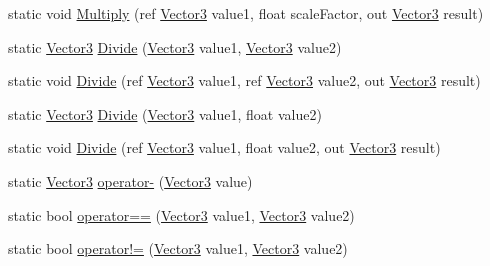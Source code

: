 \begin{DoxyCompactItemize}
\item 
static void \hyperlink{struct_microsoft_1_1_xna_1_1_framework_1_1_vector3_a5cb2ccf131794a63435195fb5d35fe67}{Multiply} (ref \hyperlink{struct_microsoft_1_1_xna_1_1_framework_1_1_vector3}{Vector3} value1, float scale\+Factor, out \hyperlink{struct_microsoft_1_1_xna_1_1_framework_1_1_vector3}{Vector3} result)
\item 
static \hyperlink{struct_microsoft_1_1_xna_1_1_framework_1_1_vector3}{Vector3} \hyperlink{struct_microsoft_1_1_xna_1_1_framework_1_1_vector3_aabf99746838a9b273d7f9c938a003469}{Divide} (\hyperlink{struct_microsoft_1_1_xna_1_1_framework_1_1_vector3}{Vector3} value1, \hyperlink{struct_microsoft_1_1_xna_1_1_framework_1_1_vector3}{Vector3} value2)
\item 
static void \hyperlink{struct_microsoft_1_1_xna_1_1_framework_1_1_vector3_a0645910ea99edbd29f4e95ff46437810}{Divide} (ref \hyperlink{struct_microsoft_1_1_xna_1_1_framework_1_1_vector3}{Vector3} value1, ref \hyperlink{struct_microsoft_1_1_xna_1_1_framework_1_1_vector3}{Vector3} value2, out \hyperlink{struct_microsoft_1_1_xna_1_1_framework_1_1_vector3}{Vector3} result)
\item 
static \hyperlink{struct_microsoft_1_1_xna_1_1_framework_1_1_vector3}{Vector3} \hyperlink{struct_microsoft_1_1_xna_1_1_framework_1_1_vector3_a8233b2cd884d66e2357816d1c984faea}{Divide} (\hyperlink{struct_microsoft_1_1_xna_1_1_framework_1_1_vector3}{Vector3} value1, float value2)
\item 
static void \hyperlink{struct_microsoft_1_1_xna_1_1_framework_1_1_vector3_a707b967e4517f042fe2e37ca19b8edaa}{Divide} (ref \hyperlink{struct_microsoft_1_1_xna_1_1_framework_1_1_vector3}{Vector3} value1, float value2, out \hyperlink{struct_microsoft_1_1_xna_1_1_framework_1_1_vector3}{Vector3} result)
\item 
static \hyperlink{struct_microsoft_1_1_xna_1_1_framework_1_1_vector3}{Vector3} \hyperlink{struct_microsoft_1_1_xna_1_1_framework_1_1_vector3_afc645a66ce3b5de97a42c91ed90bc872}{operator-\/} (\hyperlink{struct_microsoft_1_1_xna_1_1_framework_1_1_vector3}{Vector3} value)
\item 
static bool \hyperlink{struct_microsoft_1_1_xna_1_1_framework_1_1_vector3_a1218d2593dffaf46f68e29234590d471}{operator==} (\hyperlink{struct_microsoft_1_1_xna_1_1_framework_1_1_vector3}{Vector3} value1, \hyperlink{struct_microsoft_1_1_xna_1_1_framework_1_1_vector3}{Vector3} value2)
\item 
static bool \hyperlink{struct_microsoft_1_1_xna_1_1_framework_1_1_vector3_a06cdb63cdd50ed6de7578fc33fa0820a}{operator!=} (\hyperlink{struct_microsoft_1_1_xna_1_1_framework_1_1_vector3}{Vector3} value1, \hyperlink{struct_microsoft_1_1_xna_1_1_framework_1_1_vector3}{Vector3} value2)

\end{DoxyCompactItemize}
